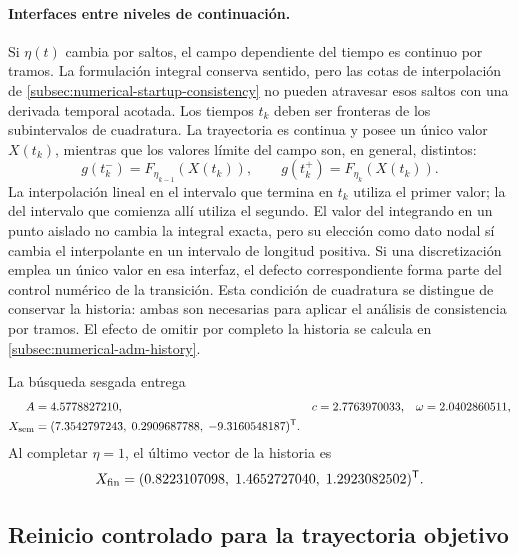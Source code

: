 \paragraph{Interfaces entre niveles de continuación.}
\label{subsec:numerical-continuation-interfaces}
Si \(\eta(t)\) cambia por saltos, el campo dependiente del tiempo es continuo
por tramos. La formulación integral conserva sentido, pero las cotas de
interpolación de \cref{subsec:numerical-startup-consistency} no pueden
atravesar esos saltos con una derivada temporal acotada. Los tiempos \(t_k\)
deben ser fronteras de los subintervalos de cuadratura. La trayectoria es
continua y posee un único valor \(X(t_k)\), mientras que los valores límite
del campo son, en general, distintos:
\[
 g(t_k^-)=F_{\eta_{k-1}}(X(t_k)),\qquad
 g(t_k^+)=F_{\eta_k}(X(t_k)).
\]
La interpolación lineal en el intervalo que termina en \(t_k\) utiliza el
primer valor; la del intervalo que comienza allí utiliza el segundo. El
valor del integrando en un punto aislado no cambia la integral exacta, pero
su elección como dato nodal sí cambia el interpolante en un intervalo de
longitud positiva. Si una discretización emplea un único valor en esa
interfaz, el defecto correspondiente forma parte del control numérico de la
transición. Esta condición de cuadratura se distingue de conservar la
historia: ambas son necesarias para aplicar el análisis de consistencia
por tramos. El efecto de omitir por completo la historia se calcula en
\cref{subsec:numerical-adm-history}.

La búsqueda sesgada entrega
\begin{equation}
\begin{aligned}
A&=4.5778827210,&
c&=2.7763970033,&
\omega&=2.0402860511,\\
X_{\mathrm{sem}}&=
(7.3542797243,\;0.2909687788,\;-9.3160548187)^{\mathsf T}.
\end{aligned}
\label{eq:datos_semilla_no_suave}
\end{equation}
Al completar \(\eta=1\), el último vector de la historia es
\begin{equation}
X_{\mathrm{fin}}=
(0.8223107098,\;1.4652727040,\;1.2923082502)^{\mathsf T}.
\label{eq:endpoint_no_suave}
\end{equation}

\subsection{Reinicio controlado para la trayectoria objetivo}
\label{sec:reinicio_objetivo}

